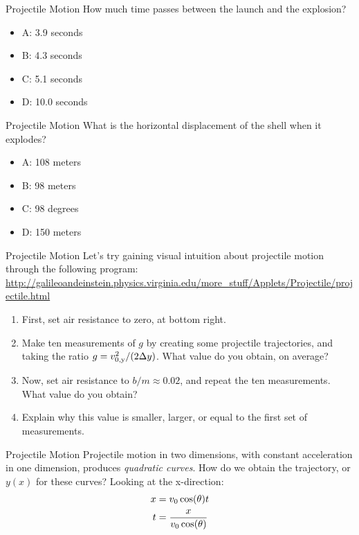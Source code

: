 \documentclass{beamer}
\begin{document}
\begin{frame}{Projectile Motion}
\small
How much time passes between the launch and the explosion?
\begin{itemize}
\item A: 3.9 seconds
\item B: 4.3 seconds
\item C: 5.1 seconds
\item D: 10.0 seconds
\end{itemize}
\end{frame}

\begin{frame}{Projectile Motion}
What is the horizontal displacement of the shell when it explodes?
\begin{itemize}
\item A: 108 meters
\item B: 98 meters
\item C: 98 degrees
\item D: 150 meters
\end{itemize}
\end{frame}

\begin{frame}{Projectile Motion}
\small
Let's try gaining visual intuition about projectile motion through the following program: \\
\vspace{0.25cm}
\url{http://galileoandeinstein.physics.virginia.edu/more_stuff/Applets/Projectile/projectile.html}\\
\begin{enumerate}
\item First, set air resistance to zero, at bottom right.
\item Make ten measurements of $g$ by creating some projectile trajectories, and taking the ratio $g = v_{\rm 0,y}^2/(2\Delta y)$.  What value do you obtain, on average?
\item Now, set air resistance to $b/m \approx 0.02$, and repeat the ten measurements.  What value do you obtain?
\item Explain why this value is smaller, larger, or equal to the first set of measurements.
\end{enumerate}
\end{frame}

\begin{frame}{Projectile Motion}
Projectile motion in two dimensions, with constant acceleration in one dimension, produces \textit{quadratic curves}.  How do we obtain the \alert{trajectory}, or $y(x)$ for these curves?  Looking at the x-direction:\\
\begin{align}
x &= v_{\rm 0}\cos(\theta) t \\
t &= \frac{x}{v_{\rm 0} \cos(\theta)} \label{eq:subst}
\end{align}
\end{frame}
\end{document}
